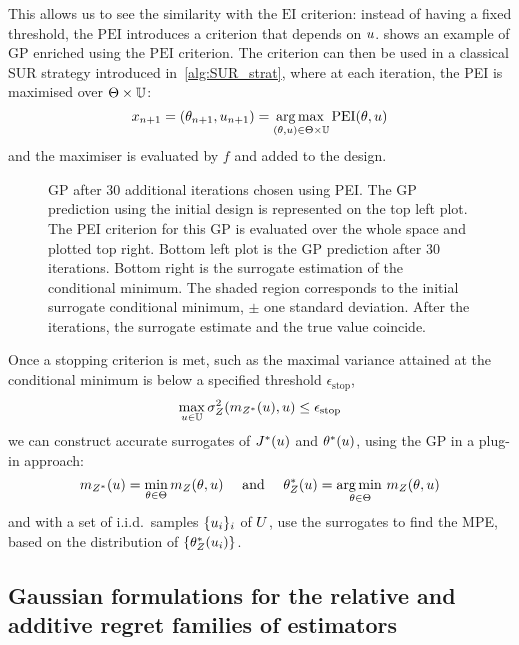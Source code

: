 \documentclass[../../Main_ManuscritThese.tex]{subfiles}
\newcommand\imgpath{/home/victor/acadwriting/Manuscrit/Text/Chapter4/img/}
\begin{document}
This allows us to see the similarity with the $\mathrm{EI}$
criterion: instead of having a fixed threshold, the $\mathrm{PEI}$
introduces a criterion that depends on $u$. 
shows an example of GP enriched using the $\mathrm{PEI}$ criterion.
The criterion can then be used in a classical SUR strategy introduced
in~\cref{alg:SUR_strat}, where at each iteration, the PEI is maximised
over $\Theta \times \mathbb{U}$:
\begin{equation}
  \label{eq:PEI_criterion_SUR}
  x_{n+1}=(\theta_{n+1}, u_{n+1}) =\operatorname*{arg\,max \,}_{(\theta, u)\in \Theta \times \mathbb{U}} \mathrm{PEI}(\theta, u)
\end{equation}
and the maximiser is evaluated by $f$ and added to the design.
\begin{figure}[ht]
  \centering
  
  \caption[Illustration of enrichment using the PEI
  criterion]{\label{fig:example_PEI} GP after 30 additional iterations
    chosen using PEI. The GP prediction using the initial design is
    represented on the top left plot. The PEI criterion for this
    GP is evaluated over the whole space and plotted top right. Bottom
    left plot is the GP prediction after 30 iterations. Bottom right
    is the surrogate estimation of the conditional minimum. The shaded
    region corresponds to the initial surrogate conditional minimum,
    $\pm$ one standard deviation. After the iterations, the surrogate
    estimate and the true value coincide.}
\end{figure}
Once a stopping criterion is met, such as the maximal variance
attained at the conditional minimum is below a specified threshold
$\epsilon_{\mathrm{stop}}$,
\begin{equation}
  \max_{u\in\mathbb{U}} \sigma^2_Z(m_{Z^*}(u), u) \leq \epsilon_{\mathrm{stop}}
\end{equation}
we can construct accurate surrogates of $J^*(u)$ and $\theta^*(u)$,
using the GP in a plug-in approach:
\begin{equation}
 m_{Z^*}(u) = \min_{\theta\in\Theta} m_Z(\theta,u)  \quad \text{ and } \quad \theta_Z^*(u) =\operatorname*{arg\,min \,}_{\theta\in\Theta} m_Z(\theta, u)
\end{equation}
and with a set of i.i.d.\ samples $\{u_i\}_i$ of $U$, use the
surrogates to find the MPE, based on the distribution of
$\{\theta_Z^*(u_i)\}$.



\subsection{Gaussian formulations for the relative and additive regret families of estimators}
\label{ssec:gp_delta_alpha}
\end{document}
